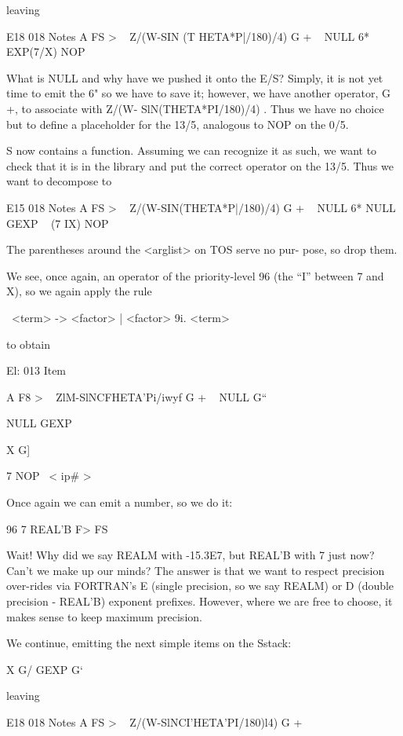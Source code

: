 
 

leaving

E18 018 Notes
A FS > \ < subject >
Z/(W-SIN (T HETA*P|/180)/4) G + \ < term >
NULL 6*
EXP(7/X) NOP \ < function >

What is NULL and why have we pushed it onto the E/S? Simply,
it is not yet time to emit the 6" so we have to save it; however,
we have another operator, G +, to associate with Z/(W-
SlN(THETA*PI/180)/4) . Thus we have no choice but to define a
placeholder for the 13/5, analogous to NOP on the 0/5.

S now contains a function. Assuming we can recognize it as
such, we want to check that it is in the library and put the
correct operator on the 13/5. Thus we want to decompose to

E15 018 Notes
A FS > \ < subject >
Z/(W-SIN(THETA*P|/180)/4) G + \ < term >
NULL 6*
NULL GEXP \ < function >
(7 IX) NOP \ < arglist >

The parentheses around the <arglist> on TOS serve no pur-
pose, so drop them.

We see, once again, an operator of the priority-level 96 (the “I”
between 7 and X), so we again apply the rule

\ <term> -> <factor> | <factor> 9i. <term>

to obtain

El: 013 Item

A F8 > \ < subject >
ZlM-SlNCFHETA'Pi/iwyf G + \ < term >
NULL G“

NULL GEXP

X G] \ < id >

7 NOP \ < ip\# >

Once again we can emit a number, so we do it:

96 7 REAL'B F> FS

Wait! Why did we say REALM with -15.3E7, but REAL'B with
7 just now? Can’t we make up our minds? The answer is that we
want to respect precision over-rides via FORTRAN's E (single
precision, so we say REALM) or D (double precision - REAL'B)
exponent prefixes. However, where we are free to choose, it
makes sense to keep maximum precision.

We continue, emitting the next simple items on the Sstack:

X G/ GEXP G‘

leaving

E18 018 Notes
A FS > \ < subject >
Z/(W-SlNCI’HETA'PI/180)l4) G + \ < term >

